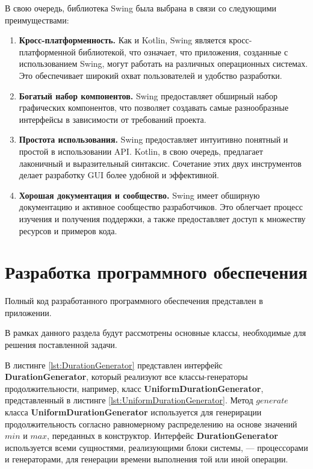 В свою очередь, библиотека Swing была выбрана в связи со следующими преимуществами:

\begin{enumerate}
	\item \textbf{Кросс-платформенность.} Как и Kotlin, Swing является кросс-платформенной библиотекой, что означает, что приложения, созданные с использованием Swing, могут работать на различных операционных системах. Это обеспечивает широкий охват пользователей и удобство разработки.
	
	\item \textbf{Богатый набор компонентов.} Swing предоставляет обширный набор графических компонентов, что позволяет создавать самые разнообразные интерфейсы в зависимости от требований проекта.

	\item \textbf{Простота использования.} Swing предоставляет интуитивно понятный и простой в использовании API. Kotlin, в свою очередь, предлагает лаконичный и выразительный синтаксис. Сочетание этих двух инструментов делает разработку GUI более удобной и эффективной.
	
	\item \textbf{Хорошая документация и сообщество.} Swing имеет обширную документацию и активное сообщество разработчиков. Это облегчает процесс изучения и получения поддержки, а также предоставляет доступ к множеству ресурсов и примеров кода.
\end{enumerate}


\section{Разработка программного обеспечения}

Полный код разработанного программного обеспечения представлен в приложении.

В рамках данного раздела будут рассмотрены основные классы, необходимые для решения поставленной задачи.


В листинге \ref{lst:DurationGenerator} представлен интерфейс \textbf{DurationGenerator}, который реализуют все классы-генераторы продолжительности, например, класс \textbf{UniformDurationGenerator}, представленный в листинге \ref{lst:UniformDurationGenerator}. Метод $generate$ класса \textbf{UniformDurationGenerator} используется для генерирации продолжительность согласно равномерному распределению на основе значений $min$ и $max$, переданных в конструктор. Интерфейс \textbf{DurationGenerator} используется всеми сущностями, реализующими блоки системы, --- процессорами и генераторами, для генерации времени выполнения той или иной операции.

